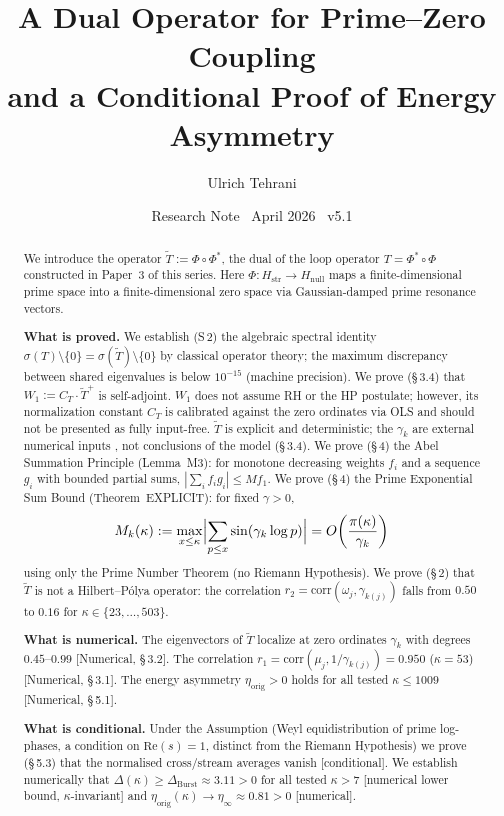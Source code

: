 \documentclass[11pt]{article}
\title{\vspace{-1.5em}\bfseries A Dual Operator for Prime--Zero Coupling\\[0.4em]
\large and a Conditional Proof of Energy Asymmetry}
\author{Ulrich Tehrani}
\date{Research Note \textperiodcentered\ April 2026 \textperiodcentered\ v5.1}
\newcommand{\Hstr}{H_{\mathrm{str}}}
\newcommand{\Hnull}{H_{\mathrm{null}}}
\newcommand{\etaorig}{\eta_{\mathrm{orig}}}
\newcommand{\Tt}{\widetilde{T}}
\newcommand{\CT}{C_{T}}
\newcommand{\Wone}{W_1}
\newcommand{\Dburstvar}{\Delta_{\mathrm{Burst}}}
\begin{document}
\maketitle

\begin{abstract}
We introduce the operator $\Tt := \Phi \circ \Phi^*$,
the dual of the loop operator $T = \Phi^* \circ \Phi$ constructed in Paper~3
of this series. Here $\Phi\colon\Hstr \to \Hnull$ maps a
finite-dimensional prime space into a finite-dimensional zero space via
Gaussian-damped prime resonance vectors.

\textbf{What is proved.}
We establish (S\,2) the algebraic spectral identity
$\sigma(T)\setminus\{0\} = \sigma(\Tt)\setminus\{0\}$
by classical operator theory; the maximum discrepancy between shared
eigenvalues is below $10^{-15}$ (machine precision).
We prove (\S\,3.4) that $\Wone := \CT\cdot\Tt^+$ is self-adjoint.
$\Wone$ does not assume RH or the HP postulate; however, its normalization
constant $\CT$ is calibrated against the zero ordinates via OLS and should
not be presented as fully input-free.
$\Tt$ is explicit and deterministic; the $\gamma_k$ are external numerical
inputs , not conclusions of the model (\S\,3.4).
We prove (\S\,4) the Abel Summation Principle (Lemma~M3):
for monotone decreasing weights $f_i$ and a sequence $g_i$ with bounded
partial sums, $|\sum_i f_i g_i| \leq M f_1$.
We prove (\S\,4) the Prime Exponential Sum Bound
(Theorem~EXPLICIT): for fixed $\gamma > 0$,
\[
M_k(\kappa) := \max_{x \leq \kappa}\Bigl|\sum_{p \leq x}\sin(\gamma_k\log p)\Bigr|
= O\!\left(\frac{\pi(\kappa)}{\gamma_k}\right)
\]
using only the Prime Number Theorem (no Riemann Hypothesis).
We prove (\S\,2) that $\Tt$ is not a
Hilbert--P\'olya operator: the correlation
$r_2 = \mathrm{corr}(\omega_j,\gamma_{k(j)})$
falls from $0.50$ to $0.16$ for $\kappa\in\{23,\ldots,503\}$.

\textbf{What is numerical.}
The eigenvectors of $\Tt$ localize at zero ordinates $\gamma_k$
with degrees $0.45$--$0.99$ [Numerical, \S\,3.2].
The correlation $r_1 = \mathrm{corr}(\mu_j,1/\gamma_{k(j)}) = 0.950$
($\kappa=53$) [Numerical, \S\,3.1].
The energy asymmetry $\etaorig > 0$ holds for all tested $\kappa\leq 1009$
[Numerical, \S\,5.1].

\textbf{What is conditional.}
Under the Assumption (Weyl equidistribution of prime log-phases,
a condition on $\mathrm{Re}(s)=1$, distinct from the Riemann
Hypothesis) we prove (\S\,5.3) that the normalised cross/stream
averages vanish [conditional].
We establish numerically that
$\Delta(\kappa)\geq\Dburstvar\approx 3.11 > 0$ for all tested $\kappa > 7$
[numerical lower bound, $\kappa$-invariant] and
$\etaorig(\kappa)\to\eta_\infty\approx 0.81 > 0$ [numerical].


\end{abstract}
\end{document}

